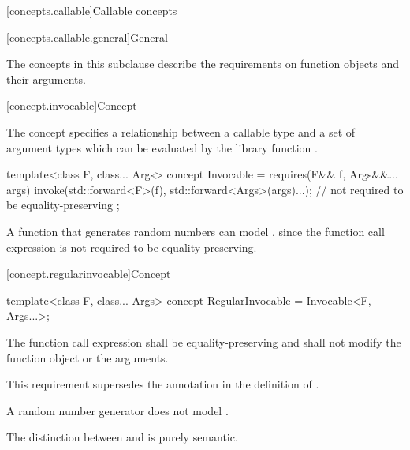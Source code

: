 [concepts.callable]{Callable concepts}

[concepts.callable.general]{General}

\pnum
The concepts in this subclause describe the requirements on function
objects and their arguments.

[concept.invocable]{Concept }

\pnum
The  concept specifies a relationship between a callable
type  and a set of argument types  which
can be evaluated by the library function .

%
\begin{itemdecl}
template<class F, class... Args>
  concept Invocable = requires(F&& f, Args&&... args) {
    invoke(std::forward<F>(f), std::forward<Args>(args)...); // not required to be equality-preserving
  };
\end{itemdecl}

\begin{itemdescr}
\pnum
\begin{example}
A function that generates random numbers can model ,
since the  function call expression is not required to be
equality-preserving.
\end{example}
\end{itemdescr}

[concept.regularinvocable]{Concept }

%
\begin{itemdecl}
template<class F, class... Args>
  concept RegularInvocable = Invocable<F, Args...>;
\end{itemdecl}

\begin{itemdescr}
\pnum
The  function call expression shall be equality-preserving and
shall not modify the function object or the
arguments.
\begin{note}
This requirement supersedes the annotation in the definition of
.
\end{note}

\pnum
\begin{example}
A random number generator does not model .
\end{example}

\pnum
\begin{note}
The distinction between  and 
is purely semantic.
\end{note}
\end{itemdescr}

